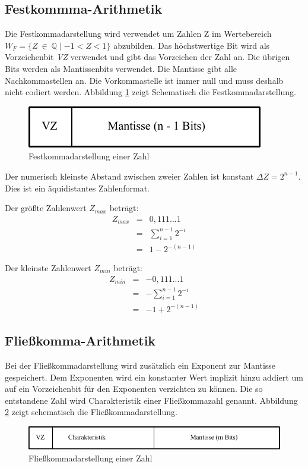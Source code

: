 \documentclass[11pt,a4paper]{scrreprt}
\begin{document}
\subsection{Festkommma-Arithmetik}
Die Festkommadarstellung wird verwendet um Zahlen Z im Wertebereich $W_F = \{ Z~\in~\mathbb{Q} \mid -1 < Z < 1\}$ abzubilden. Das höchstwertige Bit wird als Vorzeichenbit \textit{VZ} verwendet und gibt das Vorzeichen der Zahl an. Die übrigen Bits werden als Mantissenbits verwendet. Die Mantisse gibt alle Nachkommastellen an. Die Vorkommastelle ist immer null und muss deshalb nicht codiert werden. Abbildung \ref{Festkommadarstellung} zeigt Schematisch die Festkommadarstellung.

\begin{figure}[htbp] %
	\centering
	\includegraphics{Festkommaarithmetik.pdf}
	\caption{Festkommadarstellung einer Zahl}
	\label{Festkommadarstellung}
\end{figure}

Der numerisch kleinste Abstand zwischen zweier Zahlen ist konstant $\Delta Z = 2^{n-1}$. Dies ist ein äquidistantes Zahlenformat.

Der größte Zahlenwert $Z_{max}$ beträgt:
\begin{eqnarray*}
Z_{max} &=& 0,111...1              \\
        &=& \sum_{i=1}^{n-1}2^{-i} \\
        &=& 1 - 2^{-(n-1)}
\end{eqnarray*}

Der kleinste Zahlenwert $Z_{min}$ beträgt:
\begin{eqnarray*}
Z_{min} &=& -0,111...1              \\
        &=& -\sum_{i=1}^{n-1}2^{-i} \\
        &=& -1 + 2^{-(n-1)}
\end{eqnarray*}

\subsection{Fließkomma-Arithmetik}
Bei der Fließkommadarstellung wird zusätzlich ein Exponent zur Mantisse  gespeichert. Dem Exponenten wird ein konstanter Wert implizit hinzu addiert um auf ein Vorzeichenbit für den Exponenten verzichten zu können. Die so entstandene Zahl wird Charakteristik einer Fließkommazahl genannt. Abbildung \ref{Fliesskommadarstellung} zeigt schematisch die Fließkommadarstellung.
\begin{figure}[htbp] %
	\centering
	\includegraphics{Fliesskommaarithmetik.pdf}
	\caption{Fließkommadarstellung einer Zahl}
	\label{Fliesskommadarstellung}
\end{figure}
\end{document}
